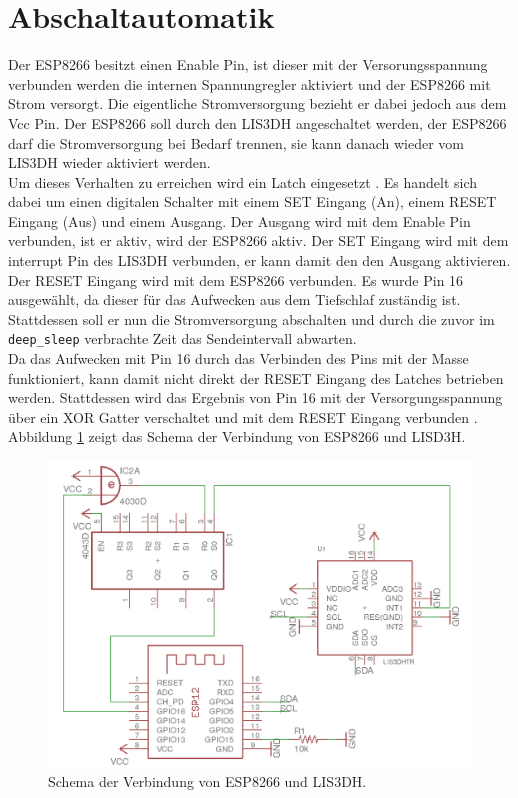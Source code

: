 \section{Abschaltautomatik}
\label{ch:Beschleunigungssensor:sec:Abschaltautomatik}
Der ESP8266 besitzt einen Enable Pin, ist dieser mit der Versorungsspannung verbunden werden die internen Spannungregler aktiviert und der ESP8266 mit Strom versorgt.
Die eigentliche Stromversorgung bezieht er dabei jedoch aus dem Vcc Pin.
Der ESP8266 soll durch den LIS3DH angeschaltet werden, der ESP8266 darf die Stromversorgung bei Bedarf trennen, sie kann danach wieder vom LIS3DH wieder aktiviert werden. \\
Um dieses Verhalten zu erreichen wird ein Latch eingesetzt \cite{texas2003latch}.
Es handelt sich dabei um einen digitalen Schalter mit einem SET Eingang (An), einem RESET Eingang (Aus) und einem Ausgang.
Der Ausgang wird mit dem Enable Pin verbunden, ist er aktiv, wird der ESP8266 aktiv.
Der SET Eingang wird mit dem interrupt Pin des LIS3DH verbunden, er kann damit den den Ausgang aktivieren.
Der RESET Eingang wird mit dem ESP8266 verbunden. 
Es wurde Pin 16 ausgewählt, da dieser für das Aufwecken aus dem Tiefschlaf zuständig ist. 
Stattdessen soll er nun die Stromversorgung abschalten und durch die zuvor im \texttt{deep\_sleep} verbrachte Zeit das Sendeintervall abwarten.\\
Da das Aufwecken mit Pin 16 durch das Verbinden des Pins mit der Masse funktioniert, kann damit nicht direkt der RESET Eingang des Latches betrieben werden.
Stattdessen wird das Ergebnis von Pin 16 mit der Versorgungsspannung über ein XOR Gatter verschaltet und mit dem RESET Eingang verbunden \cite{texas2014xor}.
Abbildung \ref{fig:schematics} zeigt das Schema der Verbindung von ESP8266 und LISD3H.

\begin{figure}[h]
  \centering
	\includegraphics[width=\textwidth]{images/schematics.png}
  \caption{Schema der Verbindung von ESP8266 und LIS3DH.}
  \label{fig:schematics}
\end{figure}

